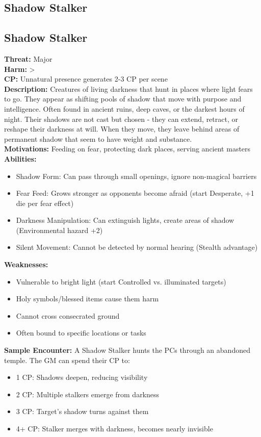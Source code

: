 \documentclass[11pt]{article}
\newenvironment{monsterentry}[1]{%
  \begin{mdframed}[backgroundcolor=shadecolor, linewidth=0pt, leftmargin=0pt, rightmargin=0pt]%
  \subsection*{#1}%
}{%
  \end{mdframed}%
}
\begin{document}
\subsection{Shadow Stalker}

\begin{monsterentry}{Shadow Stalker}
\textbf{Threat:} Major \\
\textbf{Harm:} \textgreater \\
\textbf{CP:} Unnatural presence generates 2-3 CP per scene \\
\textbf{Description:} Creatures of living darkness that hunt in places where light fears to go. They appear as shifting pools of shadow that move with purpose and intelligence. Often found in ancient ruins, deep caves, or the darkest hours of night. Their shadows are not cast but chosen - they can extend, retract, or reshape their darkness at will. When they move, they leave behind areas of permanent shadow that seem to have weight and substance. \\
\textbf{Motivations:} Feeding on fear, protecting dark places, serving ancient masters \\
\textbf{Abilities:}
\begin{itemize}
    \item Shadow Form: Can pass through small openings, ignore non-magical barriers
    \item Fear Feed: Grows stronger as opponents become afraid (start Desperate, +1 die per fear effect)
    \item Darkness Manipulation: Can extinguish lights, create areas of shadow (Environmental hazard +2)
    \item Silent Movement: Cannot be detected by normal hearing (Stealth advantage)
\end{itemize}
\textbf{Weaknesses:}
\begin{itemize}
    \item Vulnerable to bright light (start Controlled vs. illuminated targets)
    \item Holy symbols/blessed items cause them harm
    \item Cannot cross consecrated ground
    \item Often bound to specific locations or tasks
\end{itemize}
\textbf{Sample Encounter:} A Shadow Stalker hunts the PCs through an abandoned temple. The GM can spend their CP to:
\begin{itemize}
    \item 1 CP: Shadows deepen, reducing visibility
    \item 2 CP: Multiple stalkers emerge from darkness
    \item 3 CP: Target's shadow turns against them
    \item 4+ CP: Stalker merges with darkness, becomes nearly invisible
\end{itemize}
\end{monsterentry}
\end{document}
